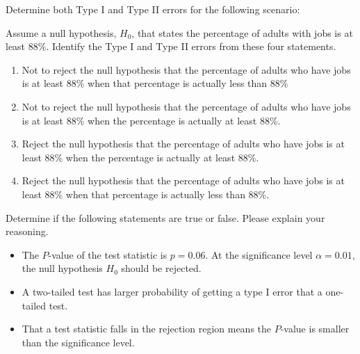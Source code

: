 \begin{exercise}

Determine both Type I and Type II errors for the following scenario:

Assume a null hypothesis, \(H_0\), that states the percentage of adults
with jobs is at least 88\%. Identify the Type I and Type II errors from
these four statements.

\begin{enumerate}
\item
  Not to reject the null hypothesis that the percentage of adults who
  have jobs is at least 88\% when that percentage is actually less than
  88\%
\item
  Not to reject the null hypothesis that the percentage of adults who
  have jobs is at least 88\% when the percentage is actually at least
  88\%.
\item
  Reject the null hypothesis that the percentage of adults who have jobs
  is at least 88\% when the percentage is actually at least 88\%.
\item
  Reject the null hypothesis that the percentage of adults who have jobs
  is at least 88\% when that percentage is actually less than 88\%.
\end{enumerate}

\end{exercise}
\vspace*{2\baselineskip}

\begin{exercise}

  Determine if the following statements are true or false. Please explain your reasoning.

  \begin{itemize}
  \item
    The \(P\)-value of the test statistic is \(p = 0.06\). At the
    significance level \(\alpha=0.01\), the null hypothesis \(H_0\)
    should be rejected.
  \item
    A two-tailed test has larger probability of getting a type I error
    that a one-tailed test.
  \item
    That a test statistic falls in the rejection region means the
    \(P\)-value is smaller than the significance level.
  \end{itemize}

\end{exercise}
\vspace*{4\baselineskip}

